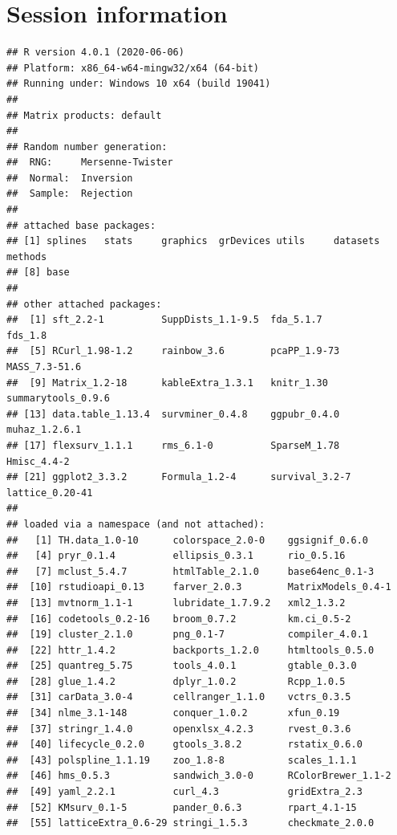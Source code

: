 \documentclass[]{article}
\begin{document}
\newpage

\section{Session information}\label{session-information}

\begin{verbatim}
## R version 4.0.1 (2020-06-06)
## Platform: x86_64-w64-mingw32/x64 (64-bit)
## Running under: Windows 10 x64 (build 19041)
## 
## Matrix products: default
## 
## Random number generation:
##  RNG:     Mersenne-Twister 
##  Normal:  Inversion 
##  Sample:  Rejection 
##  
## attached base packages:
## [1] splines   stats     graphics  grDevices utils     datasets  methods  
## [8] base     
## 
## other attached packages:
##  [1] sft_2.2-1          SuppDists_1.1-9.5  fda_5.1.7          fds_1.8           
##  [5] RCurl_1.98-1.2     rainbow_3.6        pcaPP_1.9-73       MASS_7.3-51.6     
##  [9] Matrix_1.2-18      kableExtra_1.3.1   knitr_1.30         summarytools_0.9.6
## [13] data.table_1.13.4  survminer_0.4.8    ggpubr_0.4.0       muhaz_1.2.6.1     
## [17] flexsurv_1.1.1     rms_6.1-0          SparseM_1.78       Hmisc_4.4-2       
## [21] ggplot2_3.3.2      Formula_1.2-4      survival_3.2-7     lattice_0.20-41   
## 
## loaded via a namespace (and not attached):
##   [1] TH.data_1.0-10      colorspace_2.0-0    ggsignif_0.6.0     
##   [4] pryr_0.1.4          ellipsis_0.3.1      rio_0.5.16         
##   [7] mclust_5.4.7        htmlTable_2.1.0     base64enc_0.1-3    
##  [10] rstudioapi_0.13     farver_2.0.3        MatrixModels_0.4-1 
##  [13] mvtnorm_1.1-1       lubridate_1.7.9.2   xml2_1.3.2         
##  [16] codetools_0.2-16    broom_0.7.2         km.ci_0.5-2        
##  [19] cluster_2.1.0       png_0.1-7           compiler_4.0.1     
##  [22] httr_1.4.2          backports_1.2.0     htmltools_0.5.0    
##  [25] quantreg_5.75       tools_4.0.1         gtable_0.3.0       
##  [28] glue_1.4.2          dplyr_1.0.2         Rcpp_1.0.5         
##  [31] carData_3.0-4       cellranger_1.1.0    vctrs_0.3.5        
##  [34] nlme_3.1-148        conquer_1.0.2       xfun_0.19          
##  [37] stringr_1.4.0       openxlsx_4.2.3      rvest_0.3.6        
##  [40] lifecycle_0.2.0     gtools_3.8.2        rstatix_0.6.0      
##  [43] polspline_1.1.19    zoo_1.8-8           scales_1.1.1       
##  [46] hms_0.5.3           sandwich_3.0-0      RColorBrewer_1.1-2 
##  [49] yaml_2.2.1          curl_4.3            gridExtra_2.3      
##  [52] KMsurv_0.1-5        pander_0.6.3        rpart_4.1-15       
##  [55] latticeExtra_0.6-29 stringi_1.5.3       checkmate_2.0.0    

\end{verbatim}
\end{document}
